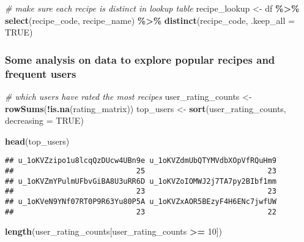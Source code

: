\documentclass[
]{article}
\newenvironment{Shaded}{\begin{snugshade}}{\end{snugshade}}
\newcommand{\AttributeTok}[1]{\textcolor[rgb]{0.13,0.29,0.53}{#1}}
\newcommand{\CommentTok}[1]{\textcolor[rgb]{0.56,0.35,0.01}{\textit{#1}}}
\newcommand{\ConstantTok}[1]{\textcolor[rgb]{0.56,0.35,0.01}{#1}}
\newcommand{\DecValTok}[1]{\textcolor[rgb]{0.00,0.00,0.81}{#1}}
\newcommand{\FunctionTok}[1]{\textcolor[rgb]{0.13,0.29,0.53}{\textbf{#1}}}
\newcommand{\NormalTok}[1]{#1}
\newcommand{\OtherTok}[1]{\textcolor[rgb]{0.56,0.35,0.01}{#1}}
\newcommand{\SpecialCharTok}[1]{\textcolor[rgb]{0.81,0.36,0.00}{\textbf{#1}}}
\begin{document}
\begin{Shaded}
\begin{Highlighting}[]
\CommentTok{\# make sure each recipe is distinct in lookup table}
\NormalTok{recipe\_lookup }\OtherTok{\textless{}{-}}\NormalTok{ df }\SpecialCharTok{\%\textgreater{}\%}
  \FunctionTok{select}\NormalTok{(recipe\_code, recipe\_name) }\SpecialCharTok{\%\textgreater{}\%}
  \FunctionTok{distinct}\NormalTok{(recipe\_code, }\AttributeTok{.keep\_all =} \ConstantTok{TRUE}\NormalTok{)  }
\end{Highlighting}
\end{Shaded}

\subsubsection{Some analysis on data to explore popular recipes and
frequent
users}\label{some-analysis-on-data-to-explore-popular-recipes-and-frequent-users}

\begin{Shaded}
\begin{Highlighting}[]
\CommentTok{\# which users have rated the most recipes}
\NormalTok{user\_rating\_counts }\OtherTok{\textless{}{-}} \FunctionTok{rowSums}\NormalTok{(}\SpecialCharTok{!}\FunctionTok{is.na}\NormalTok{(rating\_matrix))}
\NormalTok{top\_users }\OtherTok{\textless{}{-}} \FunctionTok{sort}\NormalTok{(user\_rating\_counts, }\AttributeTok{decreasing =} \ConstantTok{TRUE}\NormalTok{)}

\FunctionTok{head}\NormalTok{(top\_users)}
\end{Highlighting}
\end{Shaded}

\begin{verbatim}
## u_1oKVZzipo1u8lcqQzDUcw4UBn9e u_1oKVZdmUbQTYMVdbXOpVfRQuHm9 
##                            25                            23 
## u_1oKVZmYPulmUFbvGiBA8U3uRR6D u_1oKVZoIOMWJ2j7TA7py2BIbf1mm 
##                            23                            23 
## u_1oKVeN9YNf07RT0P9R63Yu80P5A u_1oKVZxAOR5BEzyF4H6ENc7jwfUW 
##                            23                            22
\end{verbatim}

\begin{Shaded}
\begin{Highlighting}[]
\FunctionTok{length}\NormalTok{(user\_rating\_counts[user\_rating\_counts }\SpecialCharTok{\textgreater{}=} \DecValTok{10}\NormalTok{])}
\end{Highlighting}
\end{Shaded}
\end{document}
